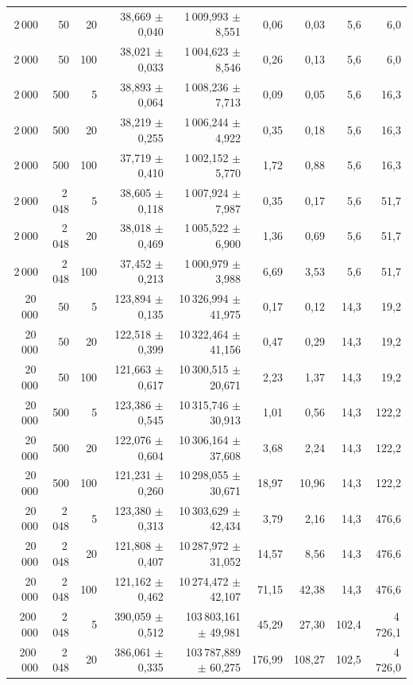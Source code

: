{\begin{tabular}{rrrrrrrrr}
2\,000 & 50 & 20 & 38,669 $\pm$ 0,040 & 1\,009,993 $\pm$ 8,551 & 0,06 & 0,03 & 5,6 & 6,0 \\
2\,000 & 50 & 100 & 38,021 $\pm$ 0,033 & 1\,004,623 $\pm$ 8,546 & 0,26 & 0,13 & 5,6 & 6,0 \\
2\,000 & 500 & 5 & 38,893 $\pm$ 0,064 & 1\,008,236 $\pm$ 7,713 & 0,09 & 0,05 & 5,6 & 16,3 \\
2\,000 & 500 & 20 & 38,219 $\pm$ 0,255 & 1\,006,244 $\pm$ 4,922 & 0,35 & 0,18 & 5,6 & 16,3 \\
2\,000 & 500 & 100 & 37,719 $\pm$ 0,410 & 1\,002,152 $\pm$ 5,770 & 1,72 & 0,88 & 5,6 & 16,3 \\
2\,000 & 2\,048 & 5 & 38,605 $\pm$ 0,118 & 1\,007,924 $\pm$ 7,987 & 0,35 & 0,17 & 5,6 & 51,7 \\
2\,000 & 2\,048 & 20 & 38,018 $\pm$ 0,469 & 1\,005,522 $\pm$ 6,900 & 1,36 & 0,69 & 5,6 & 51,7 \\
2\,000 & 2\,048 & 100 & 37,452 $\pm$ 0,213 & 1\,000,979 $\pm$ 3,988 & 6,69 & 3,53 & 5,6 & 51,7 \\
20\,000 & 50 & 5 & 123,894 $\pm$ 0,135 & 10\,326,994 $\pm$ 41,975 & 0,17 & 0,12 & 14,3 & 19,2 \\
20\,000 & 50 & 20 & 122,518 $\pm$ 0,399 & 10\,322,464 $\pm$ 41,156 & 0,47 & 0,29 & 14,3 & 19,2 \\
20\,000 & 50 & 100 & 121,663 $\pm$ 0,617 & 10\,300,515 $\pm$ 20,671 & 2,23 & 1,37 & 14,3 & 19,2 \\
20\,000 & 500 & 5 & 123,386 $\pm$ 0,545 & 10\,315,746 $\pm$ 30,913 & 1,01 & 0,56 & 14,3 & 122,2 \\
20\,000 & 500 & 20 & 122,076 $\pm$ 0,604 & 10\,306,164 $\pm$ 37,608 & 3,68 & 2,24 & 14,3 & 122,2 \\
20\,000 & 500 & 100 & 121,231 $\pm$ 0,260 & 10\,298,055 $\pm$ 30,671 & 18,97 & 10,96 & 14,3 & 122,2 \\
20\,000 & 2\,048 & 5 & 123,380 $\pm$ 0,313 & 10\,303,629 $\pm$ 42,434 & 3,79 & 2,16 & 14,3 & 476,6 \\
20\,000 & 2\,048 & 20 & 121,808 $\pm$ 0,407 & 10\,287,972 $\pm$ 31,052 & 14,57 & 8,56 & 14,3 & 476,6 \\
20\,000 & 2\,048 & 100 & 121,162 $\pm$ 0,462 & 10\,274,472 $\pm$ 42,107 & 71,15 & 42,38 & 14,3 & 476,6 \\
200\,000 & 2\,048 & 5 & 390,059 $\pm$ 0,512 & 103\,803,161 $\pm$ 49,981 & 45,29 & 27,30 & 102,4 & 4\,726,1 \\
200\,000 & 2\,048 & 20 & 386,061 $\pm$ 0,335 & 103\,787,889 $\pm$ 60,275 & 176,99 & 108,27 & 102,5 & 4\,726,0 \\
\bottomrule\end{tabular}%
}
